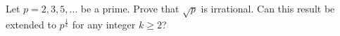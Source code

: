 \begin{exercise}
  \label{ex:hw01:prime-roots}
  Let $p=2,3,5,\ldots$ be a prime. Prove that $\sqrt{p}$ is irrational.
  Can this result be extended to $p^{\frac{1}{k}}$ for any integer $k\geq 2$?
\end{exercise}
